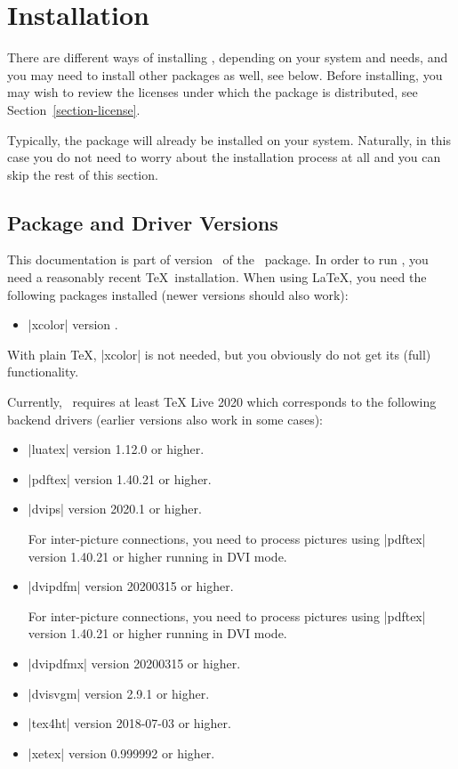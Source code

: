 %
%
%


\section[installation]{Installation}

There are different ways of installing \pgfname, depending on your system and
needs, and you may need to install other packages as well, see below. Before
installing, you may wish to review the licenses under which the package is
distributed, see Section~\ref{section-license}.

Typically, the package will already be installed on your system. Naturally, in
this case you do not need to worry about the installation process at all and
you can skip the rest of this section.


\subsection{Package and Driver Versions}

This documentation is part of version \pgfversion\ of the \pgfname\ package. In
order to run \pgfname, you need a reasonably recent \TeX\ installation. When
using \LaTeX, you need the following packages installed (newer versions should
also work):
%
\begin{itemize}
    \item |xcolor| version \xcolorversion.
\end{itemize}
%
With plain \TeX, |xcolor| is not needed, but you obviously do not get its
(full) functionality.

Currently, \pgfname\ requires at least TeX Live 2020 which corresponds to the
following backend drivers (earlier versions also work in some cases):
%
\begin{itemize}
    \item |luatex| version 1.12.0 or higher.
    \item |pdftex| version 1.40.21 or higher.
    \item |dvips| version 2020.1 or higher.

        For inter-picture connections, you need to process pictures using
        |pdftex| version 1.40.21 or higher running in DVI mode.
    \item |dvipdfm| version 20200315 or higher.

        For inter-picture connections, you need to process pictures using
        |pdftex| version 1.40.21 or higher running in DVI mode.
    \item |dvipdfmx| version 20200315 or higher.
    \item |dvisvgm| version 2.9.1 or higher.
    \item |tex4ht| version 2018-07-03 or higher.
    \item |xetex| version 0.999992 or higher.
\end{itemize}

